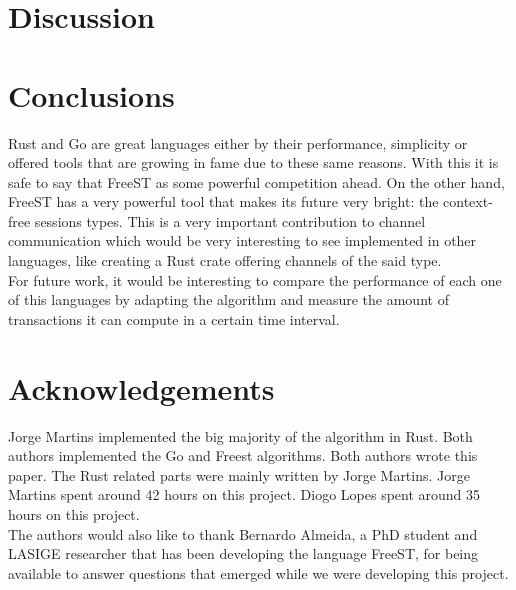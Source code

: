 \documentclass[runningheads]{llncs}
\begin{document}
\section{Discussion}
\section{Conclusions}
Rust and Go are great languages either by their performance, simplicity or offered tools that are growing in fame due to these same reasons. With this it is safe to say that FreeST as some powerful competition ahead. On the other hand, FreeST has a very powerful tool that makes its future very bright: the context-free sessions types.
This is a very important contribution to channel communication which would be very interesting to see implemented in other languages, like creating a Rust crate offering channels of the said type.
\\For future work, it would be interesting to compare the performance of each one of this languages by adapting the algorithm and measure the amount of transactions it can compute in a certain time interval.
\section*{Acknowledgements}
Jorge Martins implemented the big majority of the algorithm in Rust. Both authors implemented the Go and Freest algorithms.
Both authors wrote this paper. The Rust related parts were mainly written by Jorge Martins.
Jorge Martins spent around 42 hours on this project. Diogo Lopes spent around 35 hours on this project.\\
The authors would also like to thank Bernardo Almeida, a PhD student and LASIGE researcher that has been developing the language FreeST, for being available to answer questions that emerged while we were developing this project.


\end{document}
